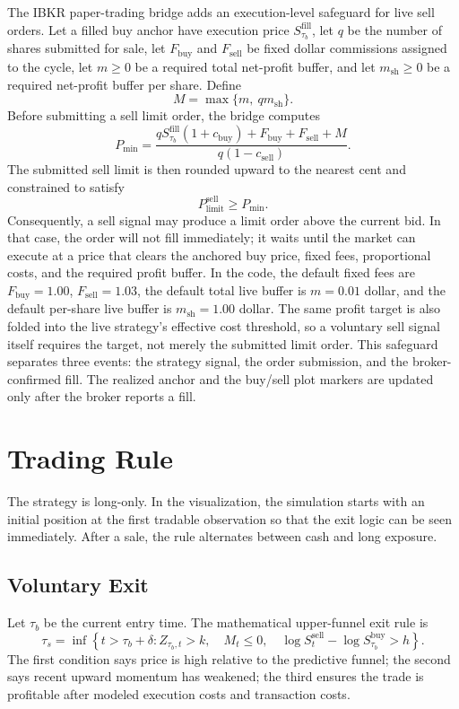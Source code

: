 \documentclass[11pt]{article}
\begin{document}
The IBKR paper-trading bridge adds an execution-level safeguard for live sell orders. Let a filled buy anchor have execution price \(S_{\tau_b}^{\mathrm{fill}}\), let \(q\) be the number of shares submitted for sale, let \(F_{\mathrm{buy}}\) and \(F_{\mathrm{sell}}\) be fixed dollar commissions assigned to the cycle, let \(m\geq 0\) be a required total net-profit buffer, and let \(m_{\mathrm{sh}}\geq 0\) be a required net-profit buffer per share. Define
\[
M=\max\{m,\ q m_{\mathrm{sh}}\}.
\]
Before submitting a sell limit order, the bridge computes
\[
P_{\min}
=
\frac{
q S_{\tau_b}^{\mathrm{fill}}(1+c_{\mathrm{buy}})
+F_{\mathrm{buy}}+F_{\mathrm{sell}}+M
}{
q(1-c_{\mathrm{sell}})
}.
\]
The submitted sell limit is then rounded upward to the nearest cent and constrained to satisfy
\[
P_{\mathrm{limit}}^{\mathrm{sell}}\geq P_{\min}.
\]
Consequently, a sell signal may produce a limit order above the current bid. In that case, the order will not fill immediately; it waits until the market can execute at a price that clears the anchored buy price, fixed fees, proportional costs, and the required profit buffer. In the code, the default fixed fees are \(F_{\mathrm{buy}}=1.00\), \(F_{\mathrm{sell}}=1.03\), the default total live buffer is \(m=0.01\) dollar, and the default per-share live buffer is \(m_{\mathrm{sh}}=1.00\) dollar. The same profit target is also folded into the live strategy's effective cost threshold, so a voluntary sell signal itself requires the target, not merely the submitted limit order. This safeguard separates three events: the strategy signal, the order submission, and the broker-confirmed fill. The realized anchor and the buy/sell plot markers are updated only after the broker reports a fill.

\section{Trading Rule}

The strategy is long-only. In the visualization, the simulation starts with an initial position at the first tradable observation so that the exit logic can be seen immediately. After a sale, the rule alternates between cash and long exposure.

\subsection{Voluntary Exit}

Let \(\tau_b\) be the current entry time. The mathematical upper-funnel exit rule is
\[
\tau_s
=
\inf\left\{
t>\tau_b+\delta:
Z_{\tau_b,t}>k,\quad M_t\leq 0,\quad
\log S_t^{\mathrm{sell}}-\log S_{\tau_b}^{\mathrm{buy}}>h
\right\}.
\]
The first condition says price is high relative to the predictive funnel; the second says recent upward momentum has weakened; the third ensures the trade is profitable after modeled execution costs and transaction costs.
\end{document}
